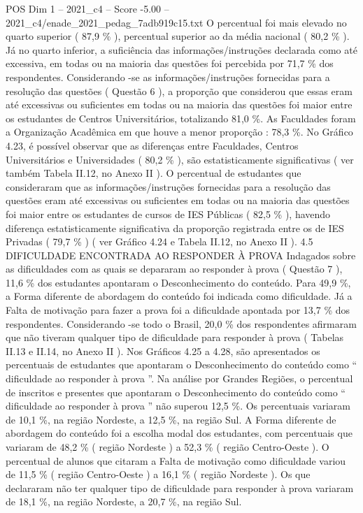 \begin{textsample}{POS Dim 1 – 2021\_c4 – Score -5.00 – 2021\_c4/enade\_2021\_pedag\_7adb919c15.txt}
O percentual foi mais elevado no quarto superior ( 87,9 \% ), percentual superior ao da média nacional ( 80,2 \% ).
Já no quarto inferior, a suficiência das informações/instruções declarada como até excessiva, em todas ou na maioria das questões foi percebida por 71,7 \% dos respondentes.
Considerando -se as informações/instruções fornecidas para a resolução das questões ( Questão 6 ), a proporção que considerou que essas eram até excessivas ou suficientes em todas ou na maioria das questões foi maior entre os estudantes de Centros Universitários, totalizando 81,0 \%.
As Faculdades foram a Organização Acadêmica em que houve a menor proporção : 78,3 \%.
No Gráfico 4.23, é possível observar que as diferenças entre Faculdades, Centros Universitários e Universidades ( 80,2 \% ), são estatisticamente significativas ( ver também Tabela II.12, no Anexo II ).
O percentual de estudantes que consideraram que as informações/instruções fornecidas para a resolução das questões eram até excessivas ou suficientes em todas ou na maioria das questões foi maior entre os estudantes de cursos de IES Públicas ( 82,5 \% ), havendo diferença estatisticamente significativa da proporção registrada entre os de IES Privadas ( 79,7 \% ) ( ver Gráfico 4.24 e Tabela II.12, no Anexo II ). 4.5 DIFICULDADE ENCONTRADA AO RESPONDER À PROVA Indagados sobre as dificuldades com as quais se depararam ao responder à prova ( Questão 7 ), 11,6 \% dos estudantes apontaram o Desconhecimento do conteúdo.
Para 49,9 \%, a Forma diferente de abordagem do conteúdo foi indicada como dificuldade.
Já a Falta de motivação para fazer a prova foi a dificuldade apontada por 13,7 \% dos respondentes.
Considerando -se todo o Brasil, 20,0 \% dos respondentes afirmaram que não tiveram qualquer tipo de dificuldade para responder à prova ( Tabelas II.13 e II.14, no Anexo II ).
Nos Gráficos 4.25 a 4.28, são apresentados os percentuais de estudantes que apontaram o Desconhecimento do conteúdo como “ dificuldade ao responder à prova ”.
Na análise por Grandes Regiões, o percentual de inscritos e presentes que apontaram o Desconhecimento do conteúdo como “ dificuldade ao responder à prova ” não superou 12,5 \%.
Os percentuais variaram de 10,1 \%, na região Nordeste, a 12,5 \%, na região Sul.
A Forma diferente de abordagem do conteúdo foi a escolha modal dos estudantes, com percentuais que variaram de 48,2 \% ( região Nordeste ) a 52,3 \% ( região Centro-Oeste ).
O percentual de alunos que citaram a Falta de motivação como dificuldade variou de 11,5 \% ( região Centro-Oeste ) a 16,1 \% ( região Nordeste ).
Os que declararam não ter qualquer tipo de dificuldade para responder à prova variaram de 18,1 \%, na região Nordeste, a 20,7 \%, na região Sul.

\end{textsample}
